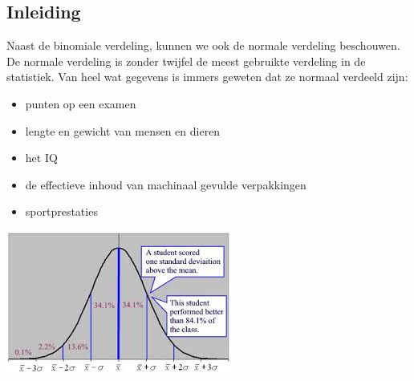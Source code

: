 \documentclass[12pt,twoside]{article}
\begin{document}
\subsection{Inleiding}

Naast de binomiale verdeling, kunnen we ook de normale verdeling beschouwen. De normale verdeling is zonder twijfel de meest gebruikte verdeling in de statistiek. Van heel wat gegevens is immers geweten dat ze normaal verdeeld zijn:

\begin{minipage}{0.6\textwidth}
\begin{itemize}
  \item punten op een examen
  \item lengte en gewicht van mensen en dieren
  \item het IQ
  \item de effectieve inhoud van machinaal gevulde verpakkingen
  \item sportprestaties
\end{itemize}
\end{minipage}
\begin{minipage}{0.4\textwidth}
  \begin{center}
    \includegraphics[width=\textwidth]{student_score}
  \end{center}
\end{minipage}
\end{document}
